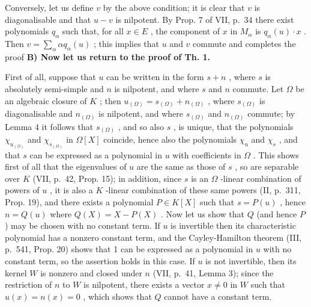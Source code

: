 Conversely, let us define \(v\) by the above condition; it is clear that \(v\) is diagonalisable and that \(u - v\) is nilpotent. By Prop. 7 of VII, p.~34 there exist polynomials \(q_{\alpha}\) such that, for all \(x \in E\) , the component of \(x\) in \(M_{\alpha}\) is \(q_{\alpha}(u) \cdot x\) . Then \(v = \sum_{\alpha} \alpha q_{\alpha}(u)\) ; this implies that \(u\) and \(v\) commute and completes the proof
\relax{}
\textbf{B) Now let us return to the proof of Th. 1.}\par

First of all, suppose that \(u\) can be written in the form \(s + n\) , where \(s\) is absolutely semi-simple and \(n\) is nilpotent, and where \(s\) and \(n\) commute. Let \(\Omega\) be an algebraic closure of \(K\) ; then \(u_{(\Omega)} = s_{(\Omega)} + n_{(\Omega)}\) , where \(s_{(\Omega)}\) is diagonalisable and \(n_{(\Omega)}\) is nilpotent, and where \(s_{(\Omega)}\) and \(n_{(\Omega)}\) commute; by Lemma 4 it follows that \(s_{(\Omega)}\) , and so also \(s\) , is unique, that the polynomials \(\chi_{u_{(\Omega)}}\) and \(\chi_{s_{(\Omega)}}\) in \(\Omega[X]\) coincide, hence also the polynomials \(\chi_u\) and \(\chi_s\) , and that \(s\) can be expressed as a polynomial in \(u\) with coefficients in \(\Omega\) . This shows first of all that the eigenvalues of \(u\) are the same as those of \(s\) , so are separable over \(K\) (VII, p.~42, Prop. 15); in addition, since \(s\) is an \(\Omega\) -linear combination of powers of \(u\) , it is also a \(K\) -linear combination of these same powers (II, p.~311, Prop. 19), and there exists a polynomial \(P \in K[X]\) such that \(s = P(u)\) , hence \(n = Q(u)\) where \(Q(X) = X - P(X)\) . Now let us show that \(Q\) (and hence \(P\) ) may be chosen with no constant term. If \(u\) is invertible then its characteristic polynomial has a nonzero constant term, and the Cayley-Hamilton theorem (III, p.~541, Prop. 20) shows that 1 can be expressed as a polynomial in \(u\) with no constant term, so the assertion holds in this case. If \(u\) is not invertible, then its kernel \(W\) is nonzero and closed under \(n\) (VII, p.~41, Lemma 3); since the restriction of \(n\) to \(W\) is nilpotent, there exists a vector \(x \neq 0\) in \(W\) such that \(u(x) = n(x) = 0\) , which shows that \(Q\) cannot have a constant term.

